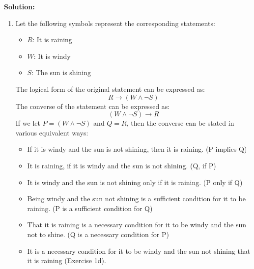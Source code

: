 \textbf{Solution:}
\begin{enumerate}[label=(\alph*)]
    \item Let the following symbols represent the corresponding statements:
        \begin{itemize}
        \item $R$: It is raining
        \item $W$: It is windy
        \item $S$: The sun is shining
        \end{itemize}
        The logical form of the original statement can be expressed as:
        $$R \rightarrow (W \wedge \neg S)$$
        The converse of the statement can be expressed as:
        $$(W \wedge \neg S) \rightarrow R $$
        If we let $P = (W \wedge \neg S)$ and $Q = R$, then the converse can be stated in various equivalent ways:
        \begin{itemize}
        \item If it is windy and the sun is not shining, then it is raining. (P implies Q)
        \item It is raining, if it is windy and the sun is not shining. (Q, if P)
        \item It is windy and the sun is not shining only if it is raining. (P only if Q)
        \item Being windy and the sun not shining is a sufficient condition for it to be raining. (P is a sufficient condition for Q)
        \item That it is raining is a necessary condition for it to be windy and the sun not to shine. (Q is a necessary condition for P)
        \item It is a necessary condition for it to be windy and the sun not shining that it is raining (Exercise 1d).
        \end{itemize}
    \pagebreak
    

\end{enumerate}
